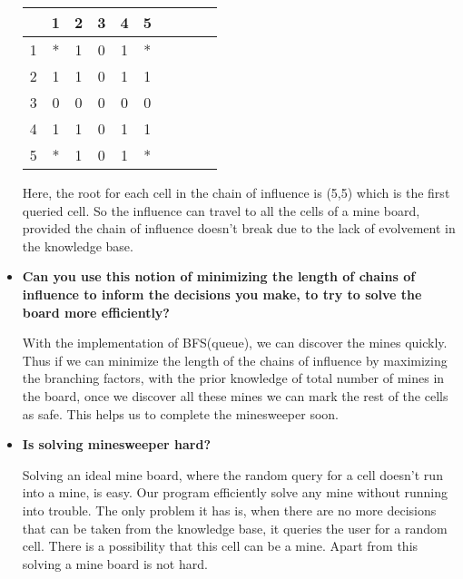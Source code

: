 \begin{itemize}
\begin{tabular}{|c|c|c|c|c|c|c|c|c|c|}
\hline
  & 1 & 2 & 3 & 4 & 5\\
\hline
1 & * & 1 & 0 & 1 & *\\
\hline
2 & 1 & 1 & 0 & 1 & 1\\
\hline
3 & 0 & 0 & 0 & 0 & 0\\
\hline
4 & 1 & 1 & 0 & 1 & 1\\
\hline
5 & * & 1 & 0 & 1 & *\\
\hline
\end{tabular}

Here, the root for each cell in the chain of influence is (5,5) which is the first queried cell. So the influence can travel to all the cells of a mine board, provided the chain of influence doesn't break due to the lack of evolvement in the knowledge base.

\item
\textbf{Can you use this notion of minimizing the length of chains of influence to inform the decisions you make, to try to solve the board more efficiently?}

With the implementation of BFS(queue), we can discover the mines quickly. Thus if we can minimize the length of the chains of influence by maximizing the branching factors, with the prior knowledge of total number of mines in the board, once we discover all these mines we can mark the rest of the cells as safe. This helps us to complete the minesweeper soon.

\item
\textbf{Is solving minesweeper hard?}

Solving an ideal mine board, where the random query for a cell doesn't run into a mine, is easy. Our program efficiently solve any mine without running into trouble. The only problem it has is, when there are no more decisions that can be taken from the knowledge base, it queries the user for a random cell. There is a possibility that this cell can be a mine. Apart from this solving a mine board is not hard.
\end{itemize}

